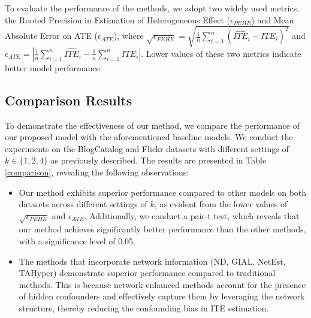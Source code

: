 \documentclass[twoside,leqno,twocolumn]{article}
\begin{document}
To evaluate the performance of the methods, we adopt two widely used metrics, the Rooted Precision in Estimation of Heterogeneous Effect ($\epsilon _{PEHE}$) and Mean Absolute Error on ATE ($\epsilon _{ATE}$), 
where
    $\sqrt{\epsilon_{PEHE}} = \sqrt{\frac{1}{n}\sum_{i=1}^{n}(\widehat{ITE}_i - ITE_i)^2}$
and
   $  \epsilon_{ATE} = |\frac{1}{n}\sum_{i=1}^{n}\widehat{ITE}_i-\frac{1}{n}\sum_{i=1}^{n}{ITE}_i|$. Lower values of these two metrics indicate better model performance.
   
\vspace{-0.5em}
\subsection{Comparison Results}
To demonstrate the effectiveness of our method, we compare the performance of our proposed model with the aforementioned baseline models. We conduct the experiments on the BlogCatalog and Flickr datasets with different settings of $k\in \{1,2,4\}$ as previously described. The results are presented in Table \ref{comparison}, revealing the following observations:
\begin{itemize}[leftmargin=*,topsep=0pt,parsep=0pt,itemsep=0pt]
\item[-]Our method exhibits superior performance compared to other models on both datasets across different settings of $k$, as evident from the lower values of $\sqrt{\epsilon_{PEHE}}$ and $\epsilon_{ATE}$.
Additionally, we conduct a pair-t test, which reveals that our method achieves significantly better performance than the other methods, with a significance level of 0.05.
\item[-]The methods that incorporate network information (ND, GIAL, NetEst, TAHyper) demonstrate superior performance compared to traditional methods. This is because network-enhanced methods account for the presence of hidden confounders and effectively capture them by leveraging the network structure, thereby reducing the confounding bias in ITE estimation. 
\end{itemize}
\vspace{-0.5em}
\end{document}
